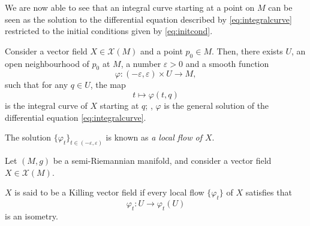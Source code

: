 We are now able to see that an integral curve starting at a point on $M$ can be seen as the solution to the differential equation described by \autoref{eq:integralcurve} restricted to the initial conditions given by \autoref{eq:initcond}.

\begin{lemma}
	Consider a vector field $X \in \mathcal{X}(M)$ and a point $p_0 \in M$. Then, there exists $U$, an open neighbourhood of $p_0$ at $M$, a number $\varepsilon > 0$ and a smooth function
	\[
		\varphi \colon (-\varepsilon, \varepsilon) \times U \to M,
	\]
	such that for any $q \in U$, the map
	\[
		t \mapsto \varphi(t,q)
	\]
	is the integral curve of $X$ starting at $q$; \ie, $\varphi$ is the general solution of the differential equation \ref{eq:integralcurve}.
	
	The solution $\{\varphi_t\}_{t \in (-\varepsilon, \varepsilon)}$ is known as \emph{a local flow of $X$}.
\end{lemma}

\begin{definition}
	Let $(M,g)$ be a semi-Riemannian manifold, and consider a vector field $X\in\mathcal{X}(M)$.
	
	$X$ is said to be a Killing vector field if every local flow $\{\varphi_t\}$ of $X$ satisfies that
	\[
		\varphi_t \colon U \to \varphi_t(U)
	\]
	is an isometry.
\end{definition}